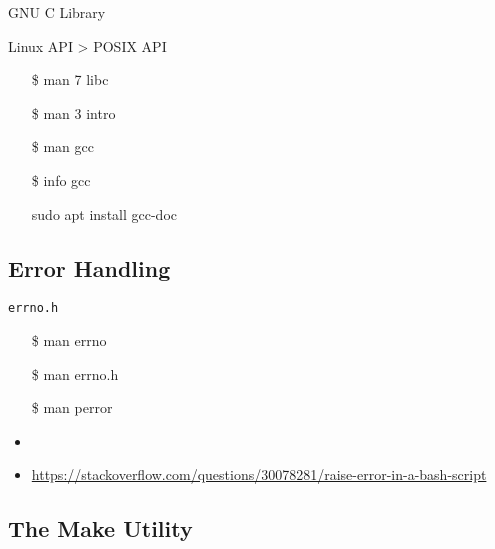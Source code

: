 \begin{frame}{GNU C Library}
  \begin{minipage}{.55\linewidth}
    Linux API > POSIX API
    \ttfamily
    \begin{itemize}
    \item[\$] man 7 libc
    \item[\$] man 3 intro
    \item[\$] man gcc
    \item[\$] info gcc
    \item[\debian] sudo apt install gcc-doc
    \end{itemize}
  \end{minipage}
  \begin{minipage}{.4\linewidth}
    \begin{center}
    \end{center}
  \end{minipage}
\end{frame}

\subsection{Error Handling}
\label{sec:error-handling}

\begin{frame}{\texttt{errno.h}}
  \begin{center}
  \end{center}\ttfamily
  \begin{itemize}
  \item[\$] man errno
  \item[\$] man errno.h
  \item[\$] man perror
  \end{itemize}
\end{frame}

\begin{itemize}
\item {}
\item \url{https://stackoverflow.com/questions/30078281/raise-error-in-a-bash-script}
\end{itemize}

\subsection{The Make Utility}

